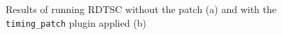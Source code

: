 \begin{figure}%
    \centering
    \caption{Results of running RDTSC without the patch (a) and with the \lstinline{timing_patch} plugin applied (b)}%
    \label{fig:rdtsc1}%
\end{figure}


